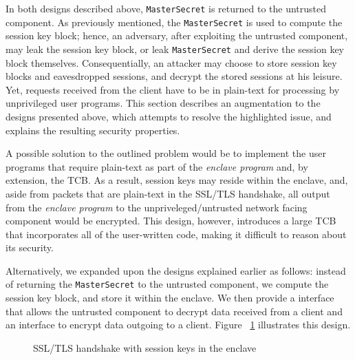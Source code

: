 \documentclass[../../main.tex]{subfiles}
\begin{document}
In both designs described above, \texttt{MasterSecret} is returned to
the untrusted component. As previously mentioned, the
\texttt{MasterSecret} is used to compute the session key block; hence,
an adversary, after exploiting the untrusted component, may leak the
session key block, or leak \texttt{MasterSecret} and derive the
session key block themselves. Consequentially, an attacker may choose
to store session key blocks and eavesdropped sessions, and decrypt the
stored sessions at his leisure. Yet, requests received from the
client have to be in plain-text for processing by unprivileged user
programs. This section describes an augmentation to the designs
presented above, which attempts to resolve the highlighted issue, and
explains the resulting security properties.

A possible solution to the outlined problem would be to implement the
user programs that require plain-text as part of the \textit{enclave
  program} and, by extension, the TCB. As a result, session keys may
reside within the enclave, and, aside from packets that are plain-text
in the SSL/TLS handshake, all output from the \textit{enclave program}
to the unpriveleged/untrusted network facing component would be
encrypted. This design, however, introduces a large TCB that
incorporates all of the user-written code, making it difficult to
reason about its security.

Alternatively, we expanded upon the designs explained earlier as
follows: instead of returning the \texttt{MasterSecret} to the
untrusted component, we compute the session key block, and store it
within the enclave. We then provide a interface that allows the
untrusted component to decrypt data received from a client and an
interface to encrypt data outgoing to a client. Figure
~\ref{fig:keys-inside} illustrates this design.

\begin{figure}[H]
  \centering
  
  \caption{SSL/TLS handshake with session keys in the enclave}
  \label{fig:keys-inside}
\end{figure}
\end{document}
